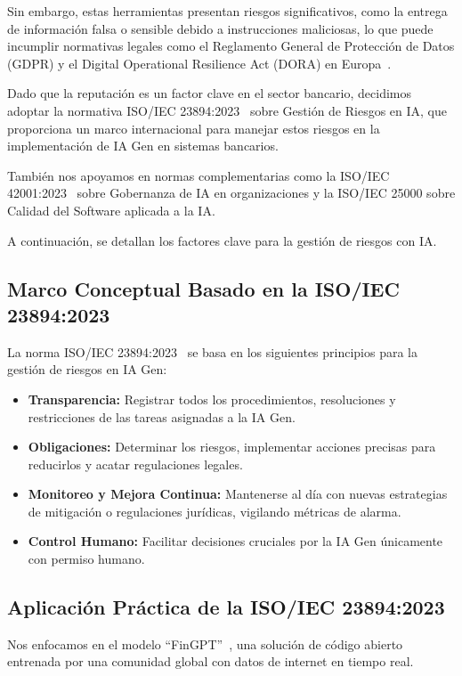 \documentclass[12pt]{article}
\begin{document}
Sin embargo, estas herramientas presentan riesgos significativos, como la entrega de información falsa o sensible debido a instrucciones maliciosas, lo que puede incumplir normativas legales como el Reglamento General de Protección de Datos (GDPR) y el Digital Operational Resilience Act (DORA) en Europa~\cite{botunac2024}.

Dado que la reputación es un factor clave en el sector bancario, decidimos adoptar la normativa ISO/IEC 23894:2023~\cite{iso23894} sobre Gestión de Riesgos en IA, que proporciona un marco internacional para manejar estos riesgos en la implementación de IA Gen en sistemas bancarios. 

También nos apoyamos en normas complementarias como la ISO/IEC 42001:2023~\cite{intedya} sobre Gobernanza de IA en organizaciones y la ISO/IEC 25000 sobre Calidad del Software aplicada a la IA. 

A continuación, se detallan los factores clave para la gestión de riesgos con IA.

\subsection{Marco Conceptual Basado en la ISO/IEC 23894:2023}
La norma ISO/IEC 23894:2023~\cite{iso23894} se basa en los siguientes principios para la gestión de riesgos en IA Gen:
\begin{itemize}
    \item \textbf{Transparencia:} Registrar todos los procedimientos, resoluciones y restricciones de las tareas asignadas a la IA Gen.
    \item \textbf{Obligaciones:} Determinar los riesgos, implementar acciones precisas para reducirlos y acatar regulaciones legales.
    \item \textbf{Monitoreo y Mejora Continua:} Mantenerse al día con nuevas estrategias de mitigación o regulaciones jurídicas, vigilando métricas de alarma.
    \item \textbf{Control Humano:} Facilitar decisiones cruciales por la IA Gen únicamente con permiso humano.
\end{itemize}

\subsection{Aplicación Práctica de la ISO/IEC 23894:2023}
Nos enfocamos en el modelo ``FinGPT''~\cite{wang2023}, una solución de código abierto entrenada por una comunidad global con datos de internet en tiempo real. 
\end{document}
